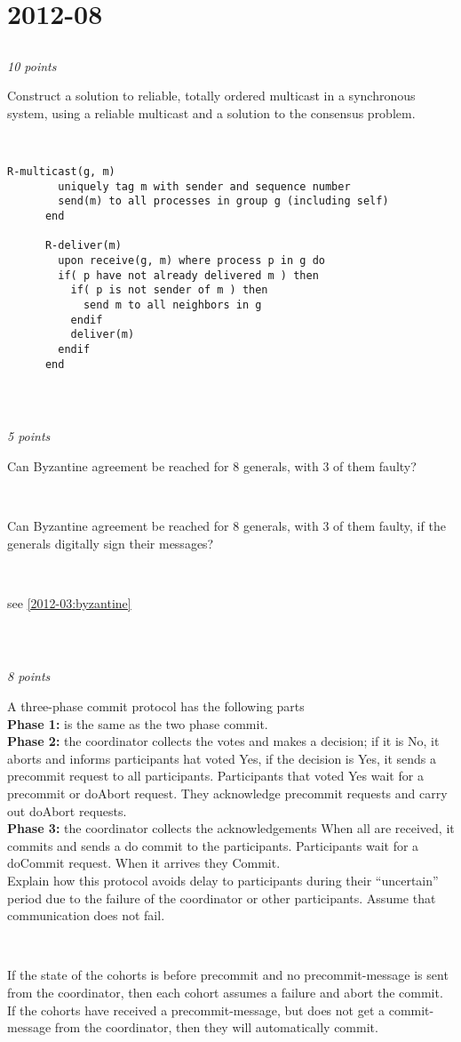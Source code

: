 \documentclass[a4paper]{article}
\newcommand{\points}[1]{\subsection{} \textit{#1 points}\\}
\newcommand{\question}[2][]{
  \parbox[t]{\textwidth}{
    \ifthenelse{\equal{#1}{}}{}{#1)}
    \parbox[t]{0.95\textwidth}{#2}}\\}
\newcommand{\solution}[2][]{
  \ifthenelse{\equal{#1}{} \or \equal{#1}{a}}{\\[3pt]\textit{Solution: }\\[0.1cm]}{}
  \parbox[t]{\textwidth}{
    \ifthenelse{\equal{#1}{}}{}{#1)}
    \parbox[t]{0.95\textwidth}{#2}}\\
}
\begin{document}
\section{2012-08}
\points{10}
\question{
  Construct a solution to reliable, totally ordered multicast
  in a synchronous system, using a reliable multicast and a solution
  to the consensus problem.
}
%
\begin{lrbox}{\userinput}
  \begin{minipage}{\linewidth}
    \begin{lstlisting}[mathescape]
      R-multicast(g, m)
        uniquely tag m with sender and sequence number
        send(m) to all processes in group g (including self)
      end

      R-deliver(m)
        upon receive(g, m) where process p in g do
        if( p have not already delivered m ) then
          if( p is not sender of m ) then
            send m to all neighbors in g
          endif
          deliver(m)
        endif
      end
    \end{lstlisting}
  \end{minipage}
\end{lrbox}
%
\solution{
  \usebox{\userinput}
}

\points{5}
\question[a]{
  Can Byzantine agreement be reached for 8 generals, with 3 of them
  faulty?
}
\question[b]{
  Can Byzantine agreement be reached for 8 generals, with 3 of them
  faulty, if the generals digitally sign their messages?
}
\solution{
  see \ref{2012-03:byzantine}
}

\points{8}
\question{
  A three-phase commit protocol has the following parts \\
  \textbf{Phase 1:} is the same as the two phase commit.\\
  \textbf{Phase 2:} the coordinator collects the votes and makes a
  decision; if it is No, it aborts and informs participants hat voted
  Yes, if the decision is Yes, it sends a precommit request to all
  participants. Participants that voted Yes wait for a precommit or
  doAbort request. They acknowledge precommit requests and carry out
  doAbort requests. \\
  \textbf{Phase 3:} the coordinator collects the acknowledgements When
  all are received, it commits and sends a do commit to the
  participants. Participants wait for a doCommit request. When it
  arrives they Commit. \\
  Explain how this protocol avoids delay to participants during their
  ``uncertain'' period due to the failure of the coordinator or other
  participants. Assume that communication does not fail.
}
\solution{
  If the state of the cohorts is before precommit and no
  precommit-message is sent from the coordinator, then each cohort
  assumes a failure and abort the commit. If the cohorts have received
  a precommit-message, but does not get a commit-message from the
  coordinator, then they will automatically commit.
}
\end{document}
